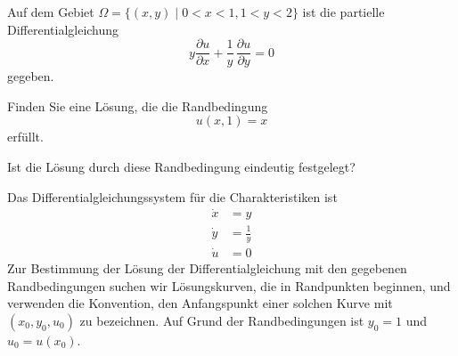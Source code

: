 Auf dem Gebiet $\Omega=\{(x,y)\;|\;0<x<1,1<y<2\}$ ist die partielle Differentialgleichung
\begin{equation}
y\frac{\partial u}{\partial x}+\frac1y\,\frac{\partial u}{\partial y}=0
\label{30000009:gleichung}
\end{equation}
gegeben.
\begin{teilaufgaben}
\item Finden Sie eine Lösung, die die Randbedingung
\[
u(x,1)=x
\]
erfüllt.
\item Ist die Lösung durch diese Randbedingung eindeutig festgelegt?
\end{teilaufgaben}

\begin{loesung}
\begin{teilaufgaben}
\item
Das Differentialgleichungssystem für die Charakteristiken ist
\begin{align}
\dot x &= y\label{30000009:1}\\
\dot y &= \frac1y\label{30000009:2}\\
\dot u &= 0\label{30000009:3}
\end{align}
Zur Bestimmung der Lösung der Differentialgleichung
mit den gegebenen Randbedingungen
suchen wir Lösungskurven, die in Randpunkten beginnen, und verwenden
die Konvention, den Anfangspunkt einer solchen Kurve mit $(x_0,y_0,u_0)$
zu bezeichnen. Auf Grund der Randbedingungen ist $y_0=1$ und $u_0=u(x_0)$.


\end{teilaufgaben}
\end{loesung}
